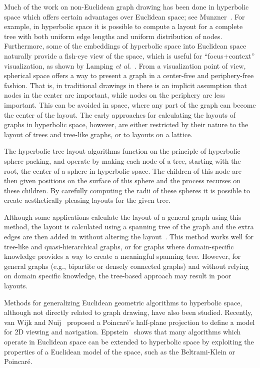 \documentclass[notitlepage,letter,11pt]{article}
\begin{document}
Much of the work on non-Euclidean graph drawing has been done in
hyperbolic space which offers certain advantages over Euclidean space;
see Munzner~\cite{Munzner+1997a,Munzner:1996:VSW}.  For example, in
hyperbolic space it is possible to compute a layout for a complete
tree with both uniform edge lengths and uniform distribution of nodes.
Furthermore, some of the embeddings of hyperbolic space into Euclidean
space naturally provide a fish-eye view of the space, which is useful
for ``focus+context'' visualization, as shown by Lamping {\em et
al.}~\cite{EVL-1995-206}. From a visualization point of view,
spherical space offers a way to present a graph in a center-free and
periphery-free fashion. That is, in traditional drawings in
 there is an implicit assumption that nodes in the
center are important, while nodes on the periphery are less
important. This can be avoided in  space, where any part
of the graph can become the center of the layout. The early approaches for calculating the
layouts of graphs in hyperbolic space, however, are either restricted
by their nature to the layout of trees and tree-like graphs, or to
layouts on a lattice.

The hyperbolic tree layout algorithms function on the principle of
hyperbolic sphere packing, and operate by making each node of a tree,
starting with the root, the center of a sphere in hyperbolic space.
The children of this node are then given positions on the surface of
this sphere and the process recurses on these children.  By carefully
computing the radii
of these spheres
it is possible to create aesthetically pleasing layouts for the
given tree. 

 Although some applications calculate the layout of a
general graph using this method, the layout is calculated using a
spanning tree of the graph and the extra edges are then added in
without altering the layout~\cite{munzner-gd98}. This method works
well for tree-like and quasi-hierarchical graphs, or for graphs
where domain-specific knowledge provides a way to create a
meaningful spanning tree. However, for general graphs (e.g.,
bipartite or densely connected graphs) and without relying on
domain specific knowledge, the tree-based approach may result in
poor layouts.

Methods for generalizing Euclidean geometric algorithms to hyperbolic
space, although not directly related to graph drawing, have also been
studied. Recently, van Wijk and Nuij~\cite{wn-msv-04} proposed a
Poincar\'{e}'s half-plane projection to define a model for 2D viewing
and navigation. Eppstein~\cite{eppstein-msri-03} shows that many
algorithms which operate in Euclidean space can be extended to
hyperbolic space by exploiting the properties of a Euclidean model of
the space, such as the Beltrami-Klein or Poincar\'{e}. 
\end{document}
